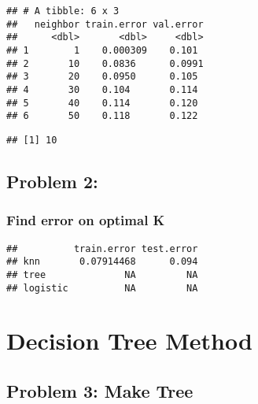 \documentclass[]{article}
\begin{document}
\begin{verbatim}
## # A tibble: 6 x 3
##   neighbor train.error val.error
##      <dbl>       <dbl>     <dbl>
## 1        1    0.000309    0.101 
## 2       10    0.0836      0.0991
## 3       20    0.0950      0.105 
## 4       30    0.104       0.114 
## 5       40    0.114       0.120 
## 6       50    0.118       0.122
\end{verbatim}

\begin{verbatim}
## [1] 10
\end{verbatim}

\hypertarget{problem-2}{%
\subsection{Problem 2:}\label{problem-2}}

\hypertarget{find-error-on-optimal-k}{%
\subsubsection{Find error on optimal K}\label{find-error-on-optimal-k}}

\begin{verbatim}
##          train.error test.error
## knn       0.07914468      0.094
## tree              NA         NA
## logistic          NA         NA
\end{verbatim}

\hypertarget{decision-tree-method}{%
\section{Decision Tree Method}\label{decision-tree-method}}

\hypertarget{problem-3-make-tree}{%
\subsection{Problem 3: Make Tree}\label{problem-3-make-tree}}
\end{document}
